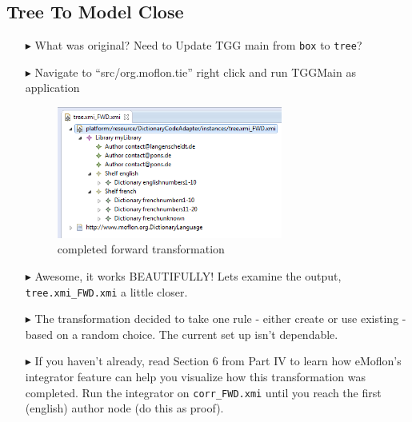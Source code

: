 \newpage
\hypertarget{t2m close}{}
\subsection{Tree To Model Close}
\genHeader

\begin{itemize}

\item[$\blacktriangleright$] What was original? Need to Update TGG main from \texttt{box} to \texttt{tree}?

\item[$\blacktriangleright$] Navigate to ``src/org.moflon.tie'' right click and run TGGMain as application

\begin{figure}[htbp]
\begin{center}
  \includegraphics[width=0.7\textwidth]{eclipse_generatedForwardTransformation}
  \caption{completed forward transformation}
  \label{eclipse:generatedFwdTrsfm}
\end{center}
\end{figure}

\item[$\blacktriangleright$] Awesome, it works BEAUTIFULLY! Lets examine the output, \texttt{tree.xmi\_FWD.xmi} a little closer.

\item[$\blacktriangleright$] The transformation decided to take one rule - either create or use existing - based on a random choice. The current set up isn't
dependable. 

\item[$\blacktriangleright$] If you haven't already, read Section 6 from Part IV to learn how eMoflon's integrator feature can help you visualize how this
transformation was completed. Run the integrator on \texttt{corr\_FWD.xmi} until you reach the first (english) author node (do this as proof).


\end{itemize}
